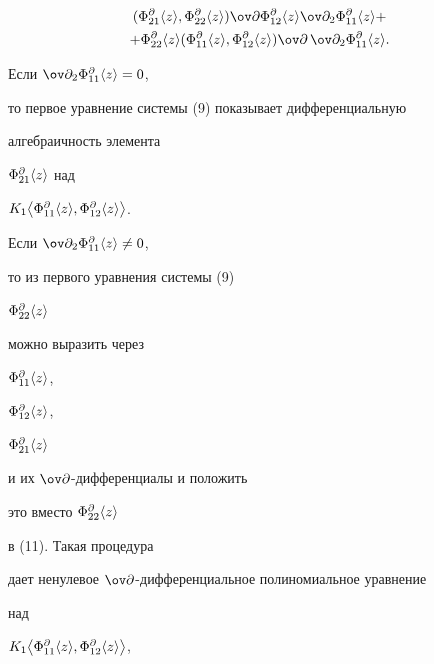 \begin{pf}
\begin{multline}
(\Phi^\partial_{21}\la z \ra, 


\Phi^\partial_{22}\la z \ra)\ov\partial 


\Phi^\partial_{12}\la z \ra\ov\partial_2 


\Phi^\partial_{11}\la z \ra + \\ 


% 


+\Phi^\partial_{22}\la z \ra 


(\Phi^\partial_{11}\la z \ra, 


\Phi^\partial_{12}\la z \ra) 


\ov\partial\,\ov\partial_2 


\Phi^\partial_{11}\la z \ra. 


\end{multline} 


 


Если $\ov\partial_2\Phi^\partial_{11}\la z \ra=0$, 


то первое уравнение системы (9) показывает дифференциальную 


алгебраичность элемента 


$\Phi^\partial_{21}\langle z \rangle$ над 


$K_1\big\la\Phi^\partial_{11}\la z \ra, 


\Phi^\partial_{12}\la z \ra\big\ra$. 


 


Если $\ov\partial_2\Phi^\partial_{11}\la z \ra\ne0$, 


то из первого уравнения системы (9)\; 


$\Phi^\partial_{22}\langle z \rangle$ 


можно выразить через 


$\Phi^\partial_{11}\langle z \rangle$, 


$\Phi^\partial_{12}\langle z \rangle$, 


$\Phi^\partial_{21}\langle z \rangle$ 


и их $\ov\partial$-дифференциалы и положить 


это вместо $\Phi^\partial_{22}\langle z \rangle$ 


в (11). Такая процедура  


дает ненулевое $\ov\partial$-дифференциальное полиномиальное уравнение 


над  


$K_1\big\la\Phi^\partial_{11}\la z \ra, 


\Phi^\partial_{12}\la z \ra\big\ra$, 



\end{pf}
